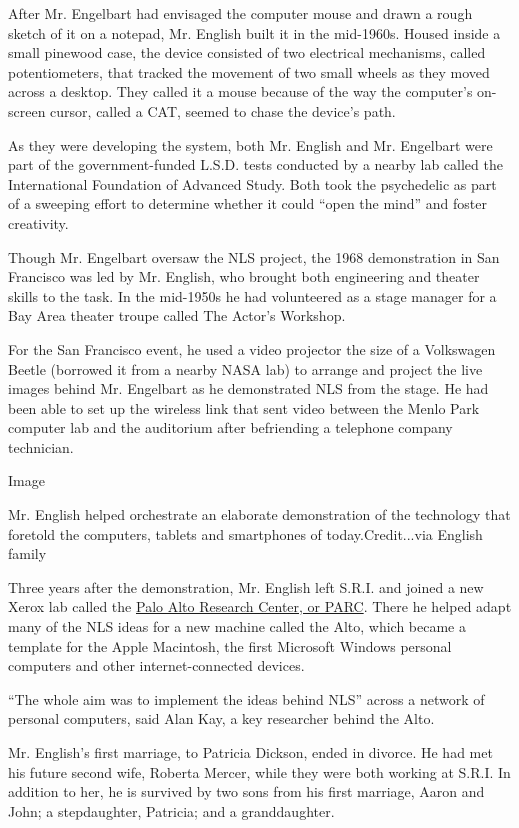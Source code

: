 After Mr. Engelbart had envisaged the computer mouse and drawn a rough
sketch of it on a notepad, Mr. English built it in the mid-1960s. Housed
inside a small pinewood case, the device consisted of two electrical
mechanisms, called potentiometers, that tracked the movement of two
small wheels as they moved across a desktop. They called it a mouse
because of the way the computer's on-screen cursor, called a CAT, seemed
to chase the device's path.

As they were developing the system, both Mr. English and Mr. Engelbart
were part of the government-funded L.S.D. tests conducted by a nearby
lab called the International Foundation of Advanced Study. Both took the
psychedelic as part of a sweeping effort to determine whether it could
``open the mind'' and foster creativity.

Though Mr. Engelbart oversaw the NLS project, the 1968 demonstration in
San Francisco was led by Mr. English, who brought both engineering and
theater skills to the task. In the mid-1950s he had volunteered as a
stage manager for a Bay Area theater troupe called The Actor's Workshop.

For the San Francisco event, he used a video projector the size of a
Volkswagen Beetle (borrowed it from a nearby NASA lab) to arrange and
project the live images behind Mr. Engelbart as he demonstrated NLS from
the stage. He had been able to set up the wireless link that sent video
between the Menlo Park computer lab and the auditorium after befriending
a telephone company technician.

Image

Mr. English helped orchestrate an elaborate demonstration of the
technology that foretold the computers, tablets and smartphones of
today.Credit...via English family

Three years after the demonstration, Mr. English left S.R.I. and joined
a new Xerox lab called the \href{https://www.parc.com/}{Palo Alto
Research Center, or PARC}. There he helped adapt many of the NLS ideas
for a new machine called the Alto, which became a template for the Apple
Macintosh, the first Microsoft Windows personal computers and other
internet-connected devices.

``The whole aim was to implement the ideas behind NLS'' across a network
of personal computers, said Alan Kay, a key researcher behind the Alto.

Mr. English's first marriage, to Patricia Dickson, ended in divorce. He
had met his future second wife, Roberta Mercer, while they were both
working at S.R.I. In addition to her, he is survived by two sons from
his first marriage, Aaron and John; a stepdaughter, Patricia; and a
granddaughter.

